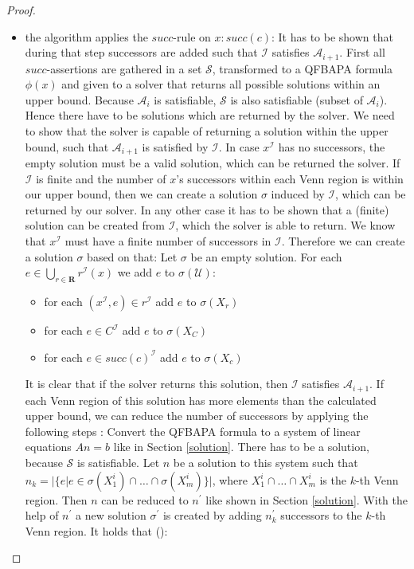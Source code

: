 \documentclass{book}
\theoremstyle{break}
\theoremstyle{definition}
\begin{document}
\begin{proof}
\begin{itemize}
\item the algorithm applies the $succ$-rule on $x:succ(c)$: It has to be  shown that during that step successors are added such that $\mathcal{I}$ satisfies $\mathcal{A}_{i+1}$. First all $succ$-assertions are gathered in a set $\mathcal{S}$, transformed to a QFBAPA formula $\phi(x)$ and given to a solver that returns all possible solutions within an upper bound. Because $\mathcal{A}_i$ is satisfiable, $\mathcal{S}$ is also satisfiable (subset of $\mathcal{A}_i$). Hence there have to be solutions which are returned by the solver. We need to show that the solver is capable of returning a solution within the upper bound, such that $\mathcal{A}_{i+1}$ is satisfied by $\mathcal{I}$. In case $x^\mathcal{I}$ has no successors, the empty solution must be a valid solution, which can be returned the solver. If $\mathcal{I}$ is finite and the number of $x$'s successors within each Venn region is within our upper bound, then we can create a solution $\sigma$ induced by $\mathcal{I}$, which can be returned by our solver. In any other case it has to be shown that a (finite) solution can be created from $\mathcal{I}$, which the solver is able to return. We know that $x^\mathcal{I}$ must have a finite number of successors in $\mathcal{I}$. Therefore we can create a solution $\sigma$ based on that: Let $\sigma$ be an empty solution. For each $e\in \bigcup_{r\in\mathbf{R}}r^\mathcal{I}(x)$ we add $e$ to $\sigma(\mathcal{U})$:
\begin{itemize}
\item for each $(x^\mathcal{I},e)\in r^\mathcal{I}$ add $e$ to $\sigma(X_r)$
\item for each $e\in C^\mathcal{I}$ add $e$ to $\sigma(X_C)$
\item for each $e\in succ(c)^\mathcal{I}$ add $e$ to $\sigma(X_c)$
\end{itemize}
It is clear that if the solver returns this solution, then $\mathcal{I}$ satisfies $\mathcal{A}_{i+1}$. If each Venn region of this solution has more elements than the calculated upper bound, we can reduce the number of successors by applying the following steps \cite{knapsack}: Convert the QFBAPA formula to a system of linear equations $An=b$ like in Section \ref{solution}. There has to be a solution, because $\mathcal{S}$ is satisfiable. Let $n$ be a solution to this system such that $n_k=|\{e|e\in \sigma(X^i_1)\cap\dots\cap\sigma(X^i_m)\}|$, where $X^i_1\cap\dots\cap X^i_m$ is the $k$-th Venn region. Then $n$ can be reduced to $n^\prime$ like shown in Section \ref{solution}. With the help of $n^\prime$ a new solution $\sigma^\prime$ is created by adding $n^\prime_k$ successors to the $k$-th Venn region. It holds that (\dag):

\end{itemize}
\end{proof}
\end{document}
